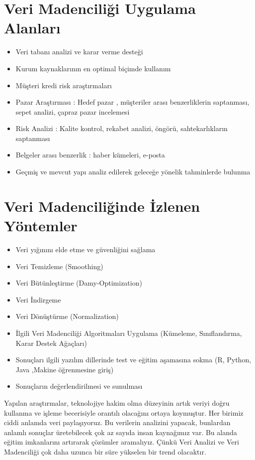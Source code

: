 \documentclass{article}
\begin{document}
\section{Veri Madenciliği Uygulama Alanları}
\begin{itemize}
    \item Veri tabanı analizi ve karar verme desteği
    \item Kurum kaynaklarının en optimal biçimde kullanım
    \item Müşteri kredi risk araştırmaları
    \item Pazar Araştırması : Hedef pazar , müşteriler arası benzerliklerin saptanması, sepet analizi, çapraz pazar incelemesi
    \item Risk Analizi : Kalite kontrol, rekabet analizi, öngörü, sahtekarlıkların
saptanması
    \item Belgeler arası benzerlik : haber kümeleri, e-posta
    \item Geçmiş ve mevcut yapı analiz edilerek geleceğe yönelik tahminlerde
bulunma
\end{itemize}

\newpage
\section{Veri Madenciliğinde İzlenen Yöntemler}
\begin{itemize}
    \item Veri yığınını elde etme ve güvenliğini sağlama
    \item Veri Temizleme (Smoothing)
    \item Veri Bütünleştirme (Damy-Optimization)
    \item Veri İndirgeme
    \item Veri Dönüştürme (Normalization)
    \item İlgili Veri Madenciliği Algoritmaları Uygulama (Kümeleme, Sınıflandırma, Karar Destek Ağaçları)
    \item Sonuçları ilgili yazılım dillerinde test ve eğitim aşamasına sokma (R, Python, Java ,Makine öğrenmesine giriş)
    \item Sonuçların değerlendirilmesi ve sunulması
\end{itemize}

\vspace{10pt}
Yapılan araştırmalar, teknolojiye hakim olma düzeyinin artık veriyi doğru kullanma ve işleme becerisiyle orantılı olacağını ortaya koymuştur. Her birimiz ciddi anlamda veri paylaşıyoruz. Bu verilerin analizini yapacak, bunlardan anlamlı sonuçlar üretebilecek çok az sayıda insan kaynağımız var. Bu alanda eğitim imkanlarını artırarak çözümler aramalıyız. Çünkü Veri Analizi ve Veri Madenciliği çok daha uzunca bir süre yükselen bir trend olacaktır.
\end{document}
